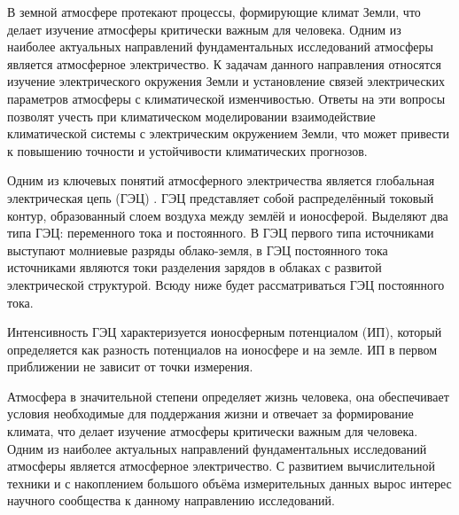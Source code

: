 
В земной атмосфере протекают процессы, формирующие климат Земли, что делает изучение атмосферы критически важным для человека. Одним из наиболее актуальных направлений фундаментальных исследований атмосферы является атмосферное электричество. К задачам данного направления относятся изучение электрического окружения Земли и установление связей электрических параметров атмосферы с климатической изменчивостью. Ответы на эти вопросы позволят учесть при климатическом моделировании взаимодействие климатической системы с электрическим окружением Земли, что может привести к повышению точности и устойчивости климатических прогнозов.

Одним из ключевых понятий атмосферного электричества является глобальная электрическая цепь (ГЭЦ) \cite{Williams_Mareev_2014}. ГЭЦ представляет собой распределённый токовый контур, образованный слоем воздуха между землёй и ионосферой. Выделяют два типа ГЭЦ: переменного тока и постоянного. В ГЭЦ первого типа источниками выступают молниевые разряды облако-земля, в ГЭЦ постоянного тока источниками являются токи разделения зарядов в облаках с развитой электрической структурой. Всюду ниже будет рассматриваться ГЭЦ постоянного тока.

Интенсивность ГЭЦ характеризуется ионосферным потенциалом (ИП), который определяется как разность потенциалов на ионосфере и на земле. ИП в первом приближении не зависит от точки измерения.


\underline{\hspace{\textwidth}}



Атмосфера в значительной степени определяет жизнь человека, она обеспечивает условия необходимые для поддержания жизни и отвечает за формирование климата, что делает изучение атмосферы критически важным для человека. Одним из наиболее актуальных направлений фундаментальных исследований атмосферы является атмосферное электричество. С развитием вычислительной техники и с накоплением большого объёма измерительных данных вырос интерес научного сообщества к данному направлению исследований.

